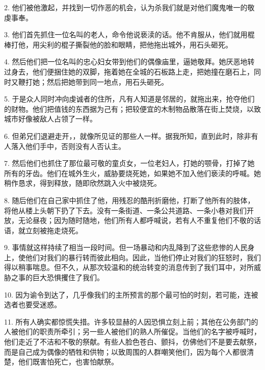 2. 他们被他激起，并找到一切作恶的机会，认为杀我们就是对他们魔鬼唯一的敬虔事奉。\par

3. 他们首先抓住一位名叫的老人，命令他说亵渎的话。他不肯服从，他们就用棍棒打他，用尖利的棍子撕裂他的脸和眼睛，把他拖出城外，用石头砸死。\par

4. 然后他们把一位名叫的忠心妇女带到他们的偶像庙里，逼她敬拜。她厌恶地转过身去，他们便捆住她的双脚，拖着她在全城的石板路上走，把她撞在磨石上，同时又鞭打她；然后把她带到同一地点，用石头砸死。\par

5. 于是众人同时冲向虔诚者的住所，凡有人知道是邻居的，就拖出来，抢夺他们的财物。他们把值钱的东西据为己有；把较便宜的木制物品散落在街上焚烧，以致城市好像被敌人占领了一样。\par

6. 但弟兄们退避走开，，就像所见证的那些人一样。据我所知，直到此时，除非有人落入他们手中，否则没有人否认主。\par

7. 然后他们也抓住了那位最可敬的童贞女，一位老妇人，打她的颚骨，打掉了她所有的牙齿。他们在城外生火，威胁要烧死她，如果她不加入他们亵渎的呼喊。她稍作恳求，得到释放，随即欣然跳入火中被烧死。\par

8. 随后他们在自己家中抓住了他，用残忍的酷刑折磨他，打断了他所有的肢体，将他从楼上头朝下扔了下去。没有一条街道、一条公共道路、一条小巷对我们开放，无论昼夜；因为随时随地，他们所有人都呼喊说，若有人不重复他们不敬的话语，就立刻被拖走烧死。\par

9. 事情就这样持续了相当一段时间。但一场暴动和内乱降到了这些悲惨的人民身上，使他们对我们的暴行转而彼此相向。因此，当他们停止对我们的狂怒时，我们得以稍事喘息。但不久，从那次较温和的统治转变的消息传到了我们耳中，对所威胁之事的巨大恐惧攫住了我们。\par

10. 因为谕令到达了，几乎像我们的主所预言的那个最可怕的时刻，若可能，连被选者也要受迷惑。\par

11. 所有人确实都惊慌失措。许多较显赫的人因恐惧立刻上前；其他在公务部门的人被他们的职责所牵引；另一些人被他们的熟人所催促。当他们的名字被呼喊时，他们走近了不洁和不敬的祭献。有些人脸色苍白、颤抖，仿佛他们不是要去献祭，而是自己成为偶像的牺牲和供物；以致周围的人群嘲笑他们，因为每个人都很清楚，他们既害怕死亡，也害怕献祭。\par


